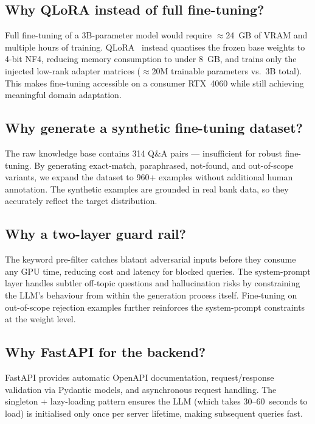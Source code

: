 \documentclass[12pt,a4paper]{article}
\begin{document}
\subsection{Why QLoRA instead of full fine-tuning?}

Full fine-tuning of a 3B-parameter model would require $\approx$24~GB of VRAM
and multiple hours of training.  QLoRA~\cite{dettmers2023qlora} instead quantises
the frozen base weights to 4-bit NF4, reducing memory consumption to under 8~GB,
and trains only the injected low-rank adapter matrices ($\approx$20M trainable
parameters vs.\ 3B total).  This makes fine-tuning accessible on a consumer
RTX~4060 while still achieving meaningful domain adaptation.

\subsection{Why generate a synthetic fine-tuning dataset?}

The raw knowledge base contains 314 Q\&A pairs — insufficient for robust fine-tuning.
By generating exact-match, paraphrased, not-found, and out-of-scope variants, we
expand the dataset to 960+ examples without additional human annotation.  The
synthetic examples are grounded in real bank data, so they accurately reflect the
target distribution.

\subsection{Why a two-layer guard rail?}

The keyword pre-filter catches blatant adversarial inputs before they consume
any GPU time, reducing cost and latency for blocked queries.  The system-prompt
layer handles subtler off-topic questions and hallucination risks by constraining
the LLM's behaviour from within the generation process itself.  Fine-tuning on
out-of-scope rejection examples further reinforces the system-prompt constraints
at the weight level.

\subsection{Why FastAPI for the backend?}

FastAPI provides automatic OpenAPI documentation, request/response validation via
Pydantic models, and asynchronous request handling.  The singleton + lazy-loading
pattern ensures the LLM (which takes 30--60~seconds to load) is initialised only
once per server lifetime, making subsequent queries fast.
\end{document}
